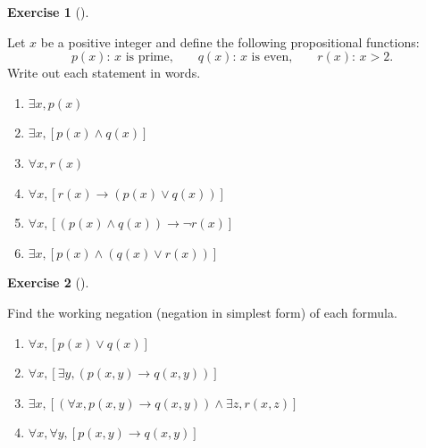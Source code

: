 \documentclass[
  letterpaper,
  10pt,
  reqno,
  twopage,
  openany]{book}
\providecommand{\tightlist}{%
  \setlength{\itemsep}{0pt}\setlength{\parskip}{0pt}}\usepackage{longtable,booktabs,array}
\theoremstyle{plain}
\theoremstyle{definition}
\newtheorem{exercise}{Exercise}[chapter]
\theoremstyle{definition}
\theoremstyle{definition}
\theoremstyle{plain}
\theoremstyle{plain}
\theoremstyle{remark}
\begin{document}
\leavevmode{}%
\begin{exercise}[]\label{exr-statement-in-words}

Let \(x\) be a positive integer and define the following propositional
functions: \[
p(x): \,  x \text{ is prime,} 
\qquad 
q(x): \, x \text{ is even,} 
\qquad
r(x): \, x>2. 
\] Write out each statement in words.

\begin{enumerate}
\def\labelenumi{\arabic{enumi}.}
\tightlist
\item
  \(\exists x, p(x)\)
\item
  \(\exists x, [p(x)\land q(x)]\)
\item
  \(\forall x, r(x)\)
\item
  \(\forall x, [r(x)\rightarrow (p(x)\lor q(x))]\)
\item
  \(\forall x, [(p(x)\land q(x))\rightarrow \neg r(x)]\)
\item
  \(\exists x, [p(x)\land (q(x)\lor r(x))]\)
\end{enumerate}

\end{exercise}

\leavevmode{}%
\begin{exercise}[]\label{exr-working-negation}

Find the working negation (negation in simplest form) of each formula.

\begin{enumerate}
\def\labelenumi{\arabic{enumi}.}
\tightlist
\item
  \(\forall x, [p(x)\lor q(x)]\)
\item
  \(\forall x, [\exists y, (p(x,y)\rightarrow q(x,y))]\)
\item
  \(\exists x, [(\forall x, p(x,y)\rightarrow q(x,y))\land \exists z, r(x,z)]\)
\item
  \(\forall x, \forall y, [p(x,y)\rightarrow q(x,y)]\)
\end{enumerate}

\end{exercise}
\end{document}
